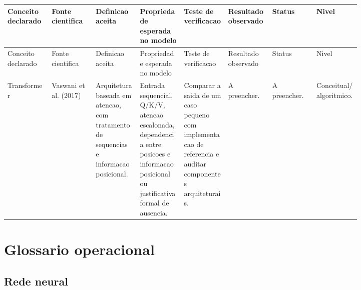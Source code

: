 \begin{landscape}
\scriptsize
\begin{longtable}{@{}>{\RaggedRight\arraybackslash}p{0.102\linewidth}>{\RaggedRight\arraybackslash}p{0.102\linewidth}>{\RaggedRight\arraybackslash}p{0.102\linewidth}>{\RaggedRight\arraybackslash}p{0.102\linewidth}>{\RaggedRight\arraybackslash}p{0.102\linewidth}>{\RaggedRight\arraybackslash}p{0.102\linewidth}>{\RaggedRight\arraybackslash}p{0.102\linewidth}>{\RaggedRight\arraybackslash}p{0.102\linewidth}@{}}
\toprule
Conceito declarado & Fonte cientifica & Definicao aceita & Propriedade esperada no modelo & Teste de verificacao & Resultado observado & Status & Nivel \\
\midrule
\endfirsthead
\toprule
Conceito declarado & Fonte cientifica & Definicao aceita & Propriedade esperada no modelo & Teste de verificacao & Resultado observado & Status & Nivel \\
\midrule
\endhead
Transformer & Vaswani et al. (2017) & Arquitetura baseada em atencao, com tratamento de sequencias e informacao posicional. & Entrada sequencial, Q/K/V, atencao escalonada, dependencia entre posicoes e informacao posicional ou justificativa formal de ausencia. & Comparar a saida de um caso pequeno com implementacao de referencia e auditar componentes arquiteturais. & A preencher. & A preencher. & Conceitual/\allowbreak{}algoritmico. \\
\bottomrule
\end{longtable}
\end{landscape}



\section{Glossario operacional}



\subsection{Rede neural}


